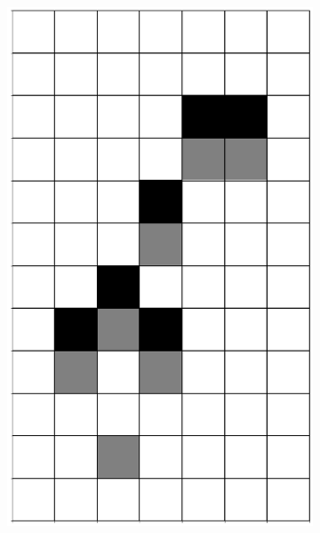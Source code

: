 \documentclass[12pt]{article}
\numberwithin{figure}{section} %
\begin{document}
\begin{figure}[H]
\begin{subfigure}{0.3\textwidth}
     \includegraphics[angle=270,width=\linewidth]{Section4/10.1}
     \subcaption{}
   \end{subfigure}
        \begin{subfigure}{0.3\textwidth}
     \centering

\end{subfigure}
\end{figure}
\end{document}
